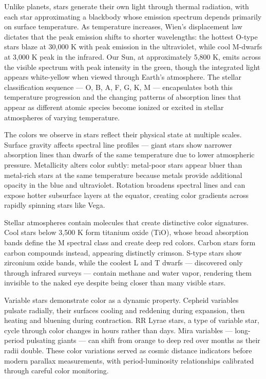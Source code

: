 Unlike planets, stars generate their own light through thermal radiation, with each star approximating a blackbody whose emission spectrum depends primarily on surface temperature. As temperature increases, Wien's displacement law dictates that the peak emission shifts to shorter wavelengths: the hottest O-type stars blaze at 30,000 K with peak emission in the ultraviolet, while cool M-dwarfs at 3,000 K peak in the infrared. Our Sun, at approximately 5,800 K, emits across the visible spectrum with peak intensity in the green, though the integrated light appears white-yellow when viewed through Earth's atmosphere. The stellar classification sequence — O, B, A, F, G, K, M — encapsulates both this temperature progression and the changing patterns of absorption lines that appear as different atomic species become ionized or excited in stellar atmospheres of varying temperature.

The colors we observe in stars reflect their physical state at multiple scales. Surface gravity affects spectral line profiles — giant stars show narrower absorption lines than dwarfs of the same temperature due to lower atmospheric pressure. Metallicity alters color subtly: metal-poor stars appear bluer than metal-rich stars at the same temperature because metals provide additional opacity in the blue and ultraviolet. Rotation broadens spectral lines and can expose hotter subsurface layers at the equator, creating color gradients across rapidly spinning stars like Vega.

Stellar atmospheres contain molecules that create distinctive color signatures. Cool stars below 3,500 K form titanium oxide (TiO), whose broad absorption bands define the M spectral class and create deep red colors. Carbon stars form carbon compounds instead, appearing distinctly crimson. S-type stars show zirconium oxide bands, while the coolest L and T dwarfs — discovered only through infrared surveys — contain methane and water vapor, rendering them invisible to the naked eye despite being closer than many visible stars.

Variable stars demonstrate color as a dynamic property. Cepheid variables pulsate radially, their surfaces cooling and reddening during expansion, then heating and bluening during contraction. RR Lyrae stars, a type of variable star, cycle through color changes in hours rather than days. Mira variables — long-period pulsating giants — can shift from orange to deep red over months as their radii double. These color variations served as cosmic distance indicators before modern parallax measurements, with period-luminosity relationships calibrated through careful color monitoring.

